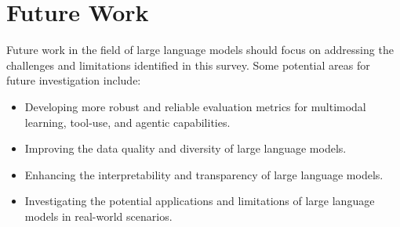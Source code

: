 \documentclass{article}
\begin{document}
\section{Future Work}
Future work in the field of large language models should focus on addressing the challenges and limitations identified in this survey. Some potential areas for future investigation include:

\begin{itemize}
\item Developing more robust and reliable evaluation metrics for multimodal learning, tool-use, and agentic capabilities.
\item Improving the data quality and diversity of large language models.
\item Enhancing the interpretability and transparency of large language models.
\item Investigating the potential applications and limitations of large language models in real-world scenarios.
\end{itemize}
\end{document}
